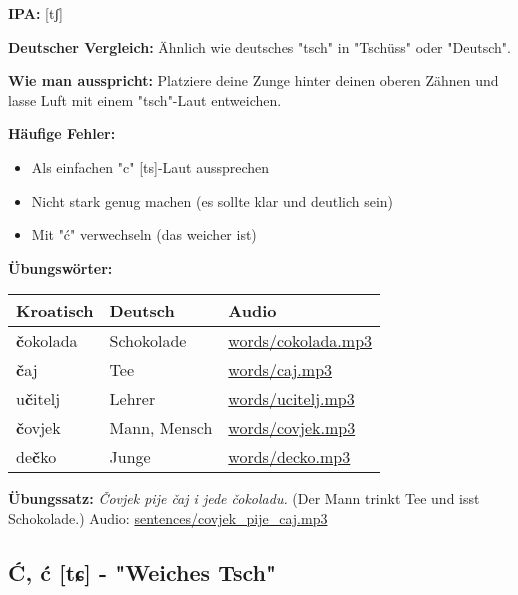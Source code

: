 \begin{tcolorbox}[breakable, colback=lightblue!30, colframe=croatianblue, title=\textbf{Č, č}]

\textbf{IPA:} [tʃ]

\textbf{Deutscher Vergleich:}
Ähnlich wie deutsches "tsch" in "Tschüss" oder "Deutsch".

\textbf{Wie man ausspricht:}
Platziere deine Zunge hinter deinen oberen Zähnen und lasse Luft mit einem "tsch"-Laut entweichen.

\textbf{Häufige Fehler:}
\begin{itemize}
    \item Als einfachen "c" [ts]-Laut aussprechen
    \item Nicht stark genug machen (es sollte klar und deutlich sein)
    \item Mit "ć" verwechseln (das weicher ist)
\end{itemize}

\textbf{Übungswörter:}
\begin{center}
\small
\begin{tabular}{lll}
\textbf{Kroatisch} & \textbf{Deutsch} & \textbf{Audio} \\
\midrule
\textbf{č}okolada & Schokolade & \small\url{words/cokolada.mp3} \\
\textbf{č}aj & Tee & \small\url{words/caj.mp3} \\
u\textbf{č}itelj & Lehrer & \small\url{words/ucitelj.mp3} \\
\textbf{č}ovjek & Mann, Mensch & \small\url{words/covjek.mp3} \\
de\textbf{č}ko & Junge & \small\url{words/decko.mp3} \\
\end{tabular}
\end{center}

\textbf{Übungssatz:}
\textit{Čovjek pije čaj i jede čokoladu.}
(Der Mann trinkt Tee und isst Schokolade.)
Audio: \small\url{sentences/covjek\_pije\_caj.mp3}

\end{tcolorbox}

\subsection{Ć, ć [tɕ] - "Weiches Tsch"}

